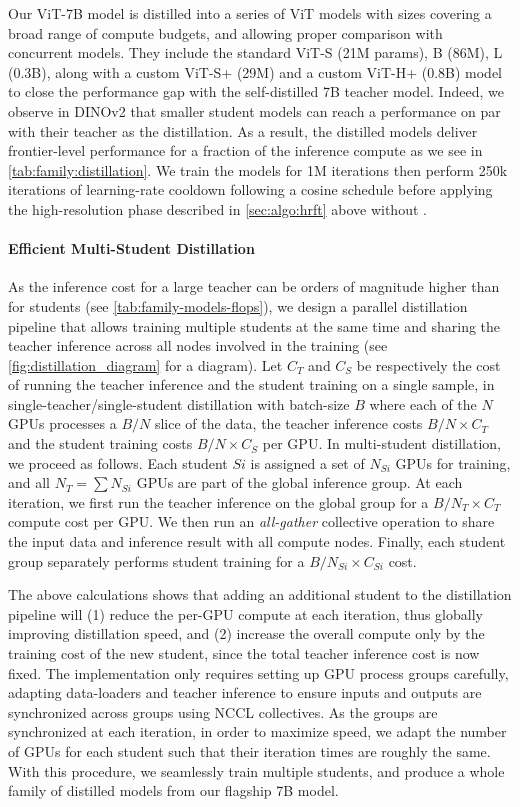 Our ViT-7B model is distilled into a series of ViT models with sizes covering a broad range of compute budgets, and allowing proper comparison with concurrent models. They include the standard ViT-S (21M params), B (86M), L (0.3B), along with a 
custom ViT-S+ (29M) and a
custom ViT-H+ (0.8B) model
to close the performance gap with the self-distilled 7B teacher model. Indeed, we observe in DINOv2 that smaller student models can reach a performance on par with their teacher as the distillation.
As a result, the distilled models deliver frontier-level performance for a fraction of the inference compute as we see in \cref{tab:family:distillation}. 
We train the models for 1M iterations then perform 250k iterations of learning-rate cooldown following a cosine schedule before applying the high-resolution phase described in \cref{sec:algo:hrft} above without \gramname.

\paragraph{Efficient Multi-Student Distillation}
As the inference cost for a large teacher can be orders of magnitude higher than for students (see \cref{tab:family-models-flops}), we design a parallel distillation pipeline that allows training multiple students at the same time and sharing the teacher inference across all nodes involved in the training (see \cref{fig:distillation_diagram} for a diagram). Let $C_T$ and $C_S$ be respectively the cost of running the teacher inference and the student training on a single sample, in single-teacher/single-student distillation with batch-size $B$ where each of the $N$ GPUs processes a $B / N$ slice of the data, the teacher inference costs $B/N \times C_T$ and the student training costs $B/N \times C_S$ per GPU. In multi-student distillation, we proceed as follows. Each student $Si$ is assigned a set of $N_{Si}$ GPUs for training, and all $N_T = \sum{N_{Si}}$ GPUs are part of the global inference group. At each iteration, we first run the teacher inference on the global group for a $B/N_T \times C_T$ compute cost per GPU. We then run an \textit{all-gather} collective operation to share the input data and inference result with all compute nodes. Finally, each student group separately performs student training for a $B/N_{Si} \times C_{Si}$ cost.

The above calculations shows that adding an additional student to the distillation pipeline will (1) reduce the per-GPU compute at each iteration, thus globally improving distillation speed, and (2) increase the overall compute only by the training cost of the new student, since the total teacher inference cost is now fixed. The implementation only requires setting up GPU process groups carefully, adapting data-loaders and teacher inference to ensure inputs and outputs are synchronized across groups using NCCL collectives. As the groups are synchronized at each iteration, in order to maximize speed, we adapt the number of GPUs for each student such that their iteration times are roughly the same.
With this procedure, we seamlessly train multiple students, and produce a whole family of distilled models from our flagship 7B model. 

